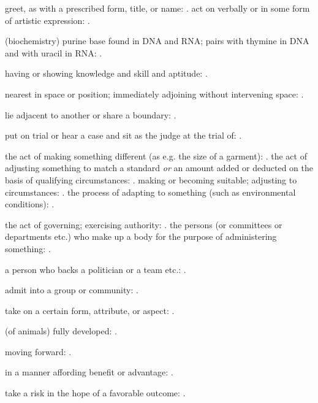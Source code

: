   greet, as with a prescribed form, title, or name: . act on verbally or in some form of artistic expression: .

  (biochemistry) purine base found in DNA and RNA; pairs with thymine in DNA and with uracil in RNA: .

  having or showing knowledge and skill and aptitude: .

  nearest in space or position; immediately adjoining without intervening space: .

  lie adjacent to another or share a boundary: .

  put on trial or hear a case and sit as the judge at the trial of: .

  the act of making something different (as e.g. the size of a garment):   . the act of adjusting something to match a standard \textit{or} an amount added or deducted on the basis of qualifying circumstances:   . making or becoming suitable; adjusting to circumstances:   . the process of adapting to something (such as environmental conditions):   .

  the act of governing; exercising authority: . the persons (or committees or departments etc.) who make up a body for the purpose of administering something: .

  a person who backs a politician or a team etc.: .

  admit into a group or community: .

  take on a certain form, attribute, or aspect: .

  (of animals) fully developed: .

  moving forward: .

  in a manner affording benefit or advantage: .

  take a risk in the hope of a favorable outcome: .

